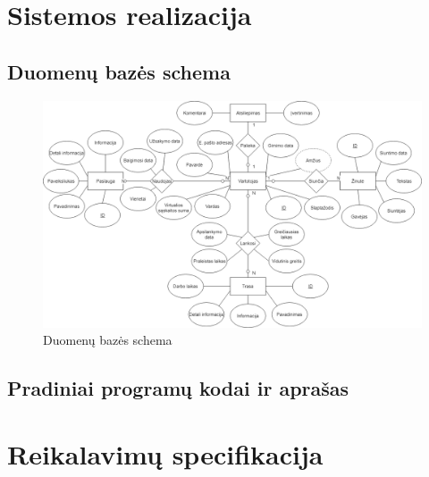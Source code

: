 \documentclass[oneside]{VUMIFPSkursinis}
\begin{document}
\section{Sistemos realizacija}
	\subsection{Duomenų bazės schema}
	\begin{figure}[h]
    				\centering
    				\includegraphics[width=1\textwidth]{Database2.png}
    				\caption{Duomenų bazės schema}
			\end{figure}
	\subsection{Pradiniai programų kodai ir aprašas}

\section{Reikalavimų specifikacija}
\end{document}
